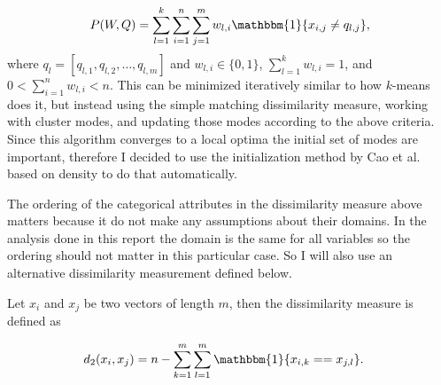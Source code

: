 \documentclass[result.tex]{subfiles}
\begin{document}
\begin{align*}
P(W, Q) = \sum_{l=1}^{k} \sum_{i=1}^{n} \sum_{j=1}^{m} w_{l,i} \mathbbm{1} \{ x_{i,j} \neq q_{l, j} \},
\end{align*}
where $q_{l} = \left[ q_{l,1}, q_{l,2}, \ldots, q_{l,m} \right]$ and $w_{l,i} \in \{ 0, 1 \}$, $\sum_{l=1}^{k} w_{l,i} = 1$, and $0 < \sum_{i=1}^{n} w_{l,i} < n$. This can be minimized iteratively similar to how $k$-means does it, but instead using the simple matching dissimilarity measure, working with cluster modes, and updating those modes according to the above criteria. Since this algorithm converges to a local optima the initial set of modes are important, therefore I decided to use the initialization method by Cao et al. \cite{cao2009new} based on density to do that automatically.

The ordering of the categorical attributes in the dissimilarity measure above matters because it do not make any assumptions about their domains. In the analysis done in this report the domain is the same for all variables so the ordering should not matter in this particular case. So I will also use an alternative dissimilarity measurement defined below.

Let $x_i$ and $x_j$ be two vectors of length $m$, then the dissimilarity measure is defined as

\begin{align*}
d_2(x_i, x_j) &= n - \sum_{k=1}^{m} \sum_{l=1}^{m} \mathbbm{1} \{ x_{i, k} == x_{j, l} \}.
\end{align*}
\end{document}
